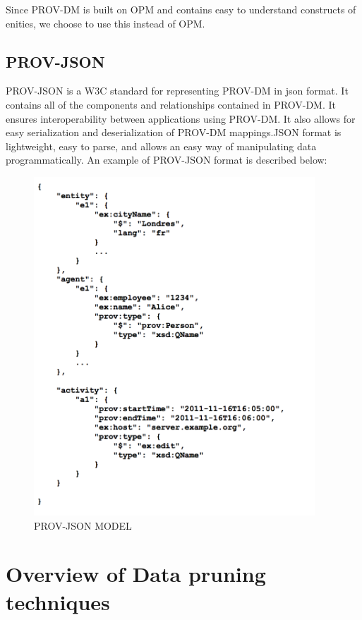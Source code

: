 Since PROV-DM is built on OPM and contains easy to understand constructs of enities, we choose to use this instead of OPM. 

\subsection{PROV-JSON}

PROV-JSON is a W3C standard for representing PROV-DM in json format. It contains all of the components and relationships contained in PROV-DM. It ensures interoperability between applications using PROV-DM. It also allows for easy serialization and deserialization of PROV-DM mappings.JSON format is lightweight, easy to parse, and allows an easy way of manipulating data programmatically. An example of PROV-JSON format is described below:

\begin{figure}[h]
\begin{center}

\includegraphics[height=5in]{prov_json.png}
\end{center}
\caption{PROV-JSON MODEL}

\end{figure}

\section{Overview of Data pruning techniques}

